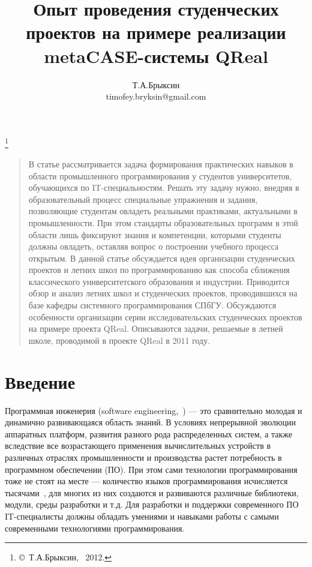 \documentclass[a4paper]{article}
\title{Опыт проведения студенческих проектов на примере реализации metaCASE-системы QReal}
\author{Т.А.Брыксин \\ timofey.bryksin@gmail.com}
\date{}
\begin{document}
\maketitle
\thispagestyle{empty}

\renewcommand{\thefootnote}{}
\footnote{\small{\copyright~Т.А.Брыксин, ~2012.}}
\renewcommand{\thefootnote}{\arabic{footnote}}
\setcounter{footnote}{0}

\begin{quote}
\small\noindent
В статье рассматривается задача формирования практических навыков в области промышленного программирования у студентов университетов, обучающихся по IT-специальностям. Решать эту задачу нужно, внедряя в образовательный процесс специальные упражнения и задания, позволяющие студентам овладеть реальными практиками, актуальными в промышленности. При этом стандарты образовательных программ в этой области лишь фиксируют знания и компетенции, которыми студенты должны овладеть, оставляя вопрос о построении учебного процесса открытым. В данной статье обсуждается идея организации студенческих проектов и летних школ по программированию как способа сближения классического университетского образования и индустрии. Приводится обзор и анализ летних школ и студенческих проектов, проводившихся на базе кафедры системного программирования СПбГУ. Обсуждаются особенности организации серии исследовательских студенческих проектов на примере проекта QReal. Описываются задачи, решаемые в летней школе, проводимой в проекте QReal в 2011 году. 
\end{quote}

\section*{Введение} 
Программная инженерия (software engineering,~\cite{terekhov1, swebok}) --- это сравнительно молодая и динамично развивающаяся область знаний. В условиях непрерывной эволюции аппаратных платформ, развития разного рода распределенных систем, а также вследствие все возрастающего применения вычислительных устройств в различных отраслях промышленности и производства растет потребность в программном обеспечении (ПО).  При этом сами технологии программирования тоже не стоят на месте --- количество языков программирования исчисляется тысячами~\cite{langList}, для многих из них создаются и развиваются различные библиотеки, модули, среды разработки и т.д. Для разработки и поддержки современного ПО IT-специалисты должны обладать умениями и навыками работы с самыми современными технологиями программирования. 
 
\end{document}
